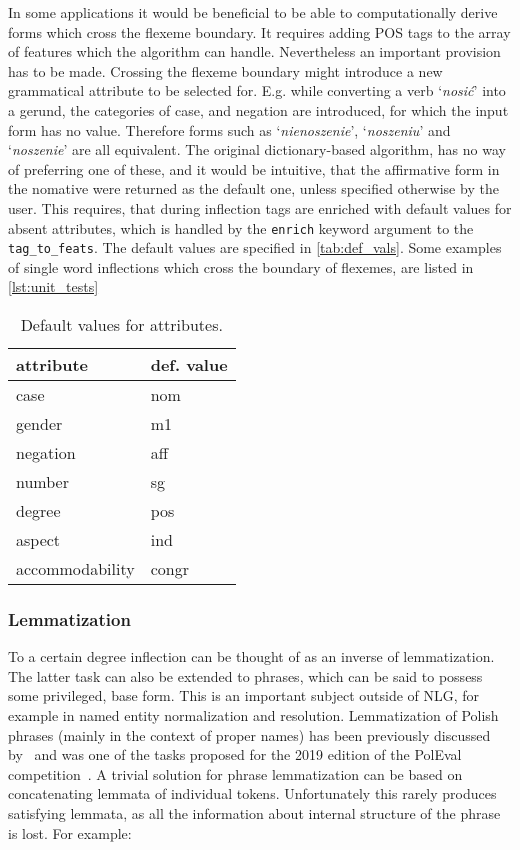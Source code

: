 \documentclass[12pt]{article}
\newcommand{\inlinegloss}[1]{`\textit{#1}'}
\begin{document}
In some applications it would be beneficial to be able to computationally derive forms which cross the flexeme boundary. It requires adding POS tags to the array of features which the algorithm can handle. 
Nevertheless an important provision has to be made. Crossing the flexeme boundary might introduce a new grammatical attribute to be selected for. E.g. while converting a verb \inlinegloss{nosić} into a gerund, the categories of case, and negation are introduced, for which the input form has no value. Therefore forms such as \inlinegloss{nienoszenie}, \inlinegloss{noszeniu} and \inlinegloss{noszenie} are all equivalent. The original dictionary-based algorithm, has no way of preferring one of these, and it would be intuitive, that the affirmative form in the nomative were returned as the default one, unless specified otherwise by the user. This requires, that during inflection tags are enriched with default values for absent attributes, which is handled by the \texttt{enrich} keyword argument to the \texttt{tag_to_feats}. The default values are specified in \autoref{tab:def_vals}. Some examples of single word inflections which cross the boundary of flexemes, are listed in \autoref{lst:unit_tests}


\begin{table}[]
\centering
\begin{tabular}{l|l}
\textbf{attribute} & \textbf{def. value} \\ \hline
case & nom \\ \hline
gender & m1 \\ \hline
negation & aff \\ \hline
number & sg \\ \hline
degree & pos \\ \hline
aspect & ind \\ \hline
accommodability & congr \\ 
\end{tabular}
\caption{Default values for attributes.}
\label{tab:def_vals}
\end{table}

\subsubsection{Lemmatization}
To a certain degree inflection can be thought of as an inverse of lemmatization. The latter task can also be extended to phrases, which can be said to possess some privileged, base form. This is an important subject outside of NLG, for example in named entity normalization and resolution. Lemmatization of Polish phrases (mainly in the context of proper names) has been previously discussed by~\cite{marcinczuk-2017-lemmatization} and was one of the tasks proposed for the 2019 edition of the PolEval competition~\cite{ogr:kob:19:poleval}. A trivial solution for phrase lemmatization can be based on concatenating lemmata of individual tokens. Unfortunately this rarely produces satisfying lemmata, as all the information about internal structure of the phrase is lost. For example:
\end{document}
